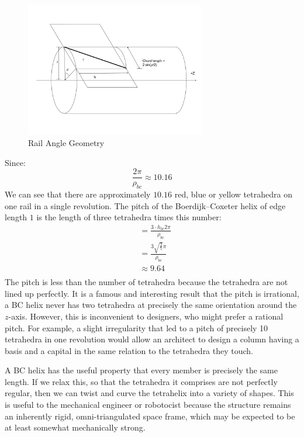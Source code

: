 \documentclass[11pt]{article}
\begin{document}
\begin{figure}[H]
  \label{railanglefig}
     \centering
     \includegraphics[width=0.7\textwidth]{figures/RailAngleGeometry.png}
     \caption{Rail Angle Geometry}
 \end{figure}

Since:
\[ \frac{2 \pi}{\rho_{bc}} \approx 10.16
\]
We can see that there are approximately $10.16$ red, blue or yellow tetrahedra on one rail in a single revolution.
The pitch of the Boerdijk--Coxeter helix of edge length $1$ is the length of three tetrahedra times this number:
\begin{align*}
  &= \frac{3 \cdot h_{bc} 2 \pi }{\rho_{bc}} \\
  &= \frac{3  \sqrt{\frac{2}{5}}  \pi}{\rho_{bc}} \\
  &\approx 9.64 \\
\end{align*}
The pitch is less than the number of tetrahedra because the tetrahedra
are not lined up perfectly.  It is a famous and interesting result
that the pitch is irrational, a BC helix never has two tetrahedra at
precisely the same orientation around the $z$-axis. However, this is
inconvenient to designers, who might prefer a rational pitch. For
example, a slight irregularity that led to a pitch of precisely 10
tetrahedra in one revolution would allow an architect to design a
column having a basis and a capital in the same relation to the
tetrahedra they touch.

A BC helix has the useful property that every member is precisely the
same length. If we relax this, so that the tetrahedra it comprises are
not perfectly regular, then we can twist and curve the tetrahelix into
a variety of shapes. This is useful to the mechanical engineer or
robotocist because the structure remains an inherently rigid,
omni-triangulated space frame, which may be expected to be at least
somewhat mechanically strong.
\end{document}

